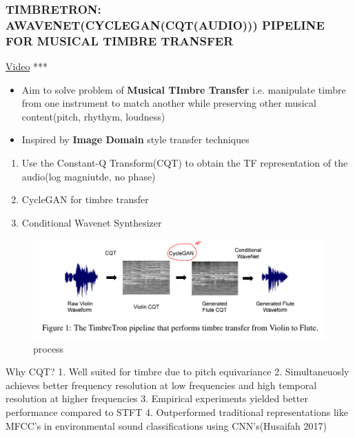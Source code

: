 \documentclass[11pt]{article}
\makeatletter
\def\maxwidth{\ifdim\Gin@nat@width>\linewidth\linewidth
    \else\Gin@nat@width\fi}
\let\Oldincludegraphics\includegraphics
\renewcommand{\includegraphics}[1]{\Oldincludegraphics[width=.8\maxwidth]{#1}}
\providecommand{\tightlist}{%
      \setlength{\itemsep}{0pt}\setlength{\parskip}{0pt}}
\makeatother
\begin{document}
\subsubsection{TIMBRETRON: AWAVENET(CYCLEGAN(CQT(AUDIO))) PIPELINE FOR
MUSICAL TIMBRE
TRANSFER}\label{timbretron-awavenetcyclegancqtaudio-pipeline-for-musical-timbre-transfer}

\href{http://www.cs.toronto.edu/~huang/TimbreTron/index.html}{Video} ***

    \begin{itemize}
\tightlist
\item
  Aim to solve problem of \textbf{Musical TImbre Transfer} i.e.
  manipulate timbre from one instrument to match another while
  preserving other musical content(pitch, rhythym, loudness)
\item
  Inspired by \textbf{Image Domain} style transfer techniques
\end{itemize}

    \begin{enumerate}
\def\labelenumi{\arabic{enumi}.}
\tightlist
\item
  Use the Constant-Q Transform(CQT) to obtain the TF representation of
  the audio(log magniutde, no phase)
\item
  CycleGAN for timbre transfer
\item
  Conditional Wavenet Synthesizer
\end{enumerate}

\begin{figure}
\centering
\includegraphics{fig_03.PNG}
\caption{process}
\end{figure}

    Why CQT? 1. Well suited for timbre due to pitch equivariance 2.
Simultaneuosly achieves better frequency resolution at low frequencies
and high temporal resolution at higher frequencies 3. Empirical
experiments yielded better performance compared to STFT 4. Outperformed
traditional representations like MFCC's in environmental sound
classifications using CNN's(Husaifah 2017)
\end{document}
